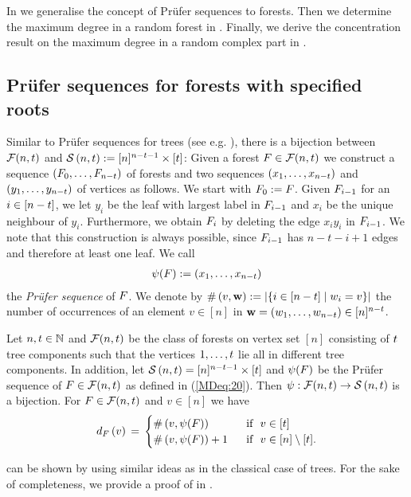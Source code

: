 In  we generalise the concept of Prüfer sequences to forests. Then we determine the maximum degree in a random forest in . Finally, we derive the concentration result on the maximum degree in a random complex part in .

\subsection{Prüfer sequences for forests with specified roots}\label{MDsub:pruefer}
Similar to Prüfer sequences for trees (see e.g. \cite{vanLintWilson2001, MatousekNesetril2009}), there is a bijection between $\mathcal{F}(n, t)$ and $\mathcal{S}\left(n, t\right):=[n]^{n-t-1}\times [t]$: Given a forest $F \in \mathcal{F}(n,t)$ we construct a sequence $\left(F_0, \ldots, F_{n-t}\right)$ of forests and two sequences $\left(x_1, \ldots, x_{n-t}\right)$ and $\left(y_1, \ldots, y_{n-t}\right)$ of vertices as follows. We start with $F_0:=F$. Given $F_{i-1}$ for an $i\in[n-t]$, we let $y_i$ be the leaf with largest label in $F_{i-1}$ and $x_i$ be the unique neighbour of $y_i$. Furthermore, we obtain $F_i$ by deleting the edge $x_iy_i$ in $F_{i-1}$. We note that this construction is always possible, since $F_{i-1}$ has $n-t-i+1$ edges and therefore at least one leaf. We call 
\begin{align}\label{MDeq:20}
\psi(F):=\left(x_1, \ldots, x_{n-t}\right)
\end{align}
the {\em Prüfer sequence} of $F$. We denote by $\#\left(v, \mathbf{w}\right):=\left|\left\{i\in[n-t] \mid w_i=v\right\}\right|$ the number of occurrences of an element $v\in[n]$ in $\mathbf{w}=\left(w_1, \ldots, w_{n-t}\right)\in[n]^{n-t}$. 

\begin{thm}\label{MDthm:pruefer}
Let $n, t\in \mathbb{N}$ and $\mathcal{F}(n,t)$ be the class of forests on vertex set $[n]$ consisting of $t$ tree components such that the vertices $1, \ldots, t$ lie all in different tree components. In addition, let $\mathcal{S}\left(n, t\right)=[n]^{n-t-1}\times [t]$ and $\psi(F)$ be the Prüfer sequence of $F\in\mathcal{F}(n,t)$ as defined in (\ref{MDeq:20}). Then $\psi:\mathcal{F}(n,t)\to \mathcal{S}\left(n, t\right)$ is a bijection. For $F\in \mathcal{F}(n,t)$ and $v\in[n]$ we have \begin{align}\label{MDeq:12}
	d_{F}\left(v\right)\hspace{0.06cm}=\hspace{0.06cm}
	\begin{cases}
		\#\left(v, \psi(F)\right) & \text{~~if~~} v\in [t]
		\\
		\#\left(v, \psi(F)\right)+1 & \text{~~if~~} v\in[n]\setminus [t].
	\end{cases}
\end{align}
\end{thm}
 can be shown by using similar ideas as in the classical case of trees. For the sake of completeness, we provide a proof of  in .

